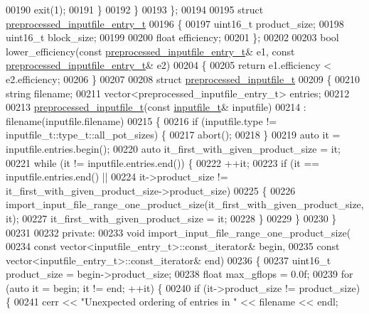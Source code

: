 \begin{DoxyCode}
{{00190       exit(1);
00191     \}
00192   \}
00193 \};
00194 
00195 \textcolor{keyword}{struct }\hyperlink{structpreprocessed__inputfile__entry__t}{preprocessed\_inputfile\_entry\_t}
00196 \{
00197   uint16\_t product\_size;
00198   uint16\_t block\_size;
00199 
00200   \textcolor{keywordtype}{float} efficiency;
00201 \};
00202 
00203 \textcolor{keywordtype}{bool} lower\_efficiency(\textcolor{keyword}{const} \hyperlink{structpreprocessed__inputfile__entry__t}{preprocessed\_inputfile\_entry\_t}& e1, \textcolor{keyword}{const} 
      \hyperlink{structpreprocessed__inputfile__entry__t}{preprocessed\_inputfile\_entry\_t}& e2)
00204 \{
00205   \textcolor{keywordflow}{return} e1.efficiency < e2.efficiency;
00206 \}
00207 
00208 \textcolor{keyword}{struct }\hyperlink{structpreprocessed__inputfile__t}{preprocessed\_inputfile\_t}
00209 \{
00210   \textcolor{keywordtype}{string} filename;
00211   vector<preprocessed\_inputfile\_entry\_t> entries;
00212 
00213   \hyperlink{structpreprocessed__inputfile__t}{preprocessed\_inputfile\_t}(\textcolor{keyword}{const} \hyperlink{structinputfile__t}{inputfile\_t}& inputfile)
00214     : filename(inputfile.filename)
00215   \{
00216     \textcolor{keywordflow}{if} (inputfile.type != inputfile\_t::type\_t::all\_pot\_sizes) \{
00217       abort();
00218     \}
00219     \textcolor{keyword}{auto} it = inputfile.entries.begin();
00220     \textcolor{keyword}{auto} it\_first\_with\_given\_product\_size = it;
00221     \textcolor{keywordflow}{while} (it != inputfile.entries.end()) \{
00222       ++it;
00223       \textcolor{keywordflow}{if} (it == inputfile.entries.end() ||
00224         it->product\_size != it\_first\_with\_given\_product\_size->product\_size)
00225       \{
00226         import\_input\_file\_range\_one\_product\_size(it\_first\_with\_given\_product\_size, it);
00227         it\_first\_with\_given\_product\_size = it;
00228       \}
00229     \}
00230   \}
00231 
00232 \textcolor{keyword}{private}:
00233   \textcolor{keywordtype}{void} import\_input\_file\_range\_one\_product\_size(
00234     \textcolor{keyword}{const} vector<inputfile\_entry\_t>::const\_iterator& begin,
00235     \textcolor{keyword}{const} vector<inputfile\_entry\_t>::const\_iterator& end)
00236   \{
00237     uint16\_t product\_size = begin->product\_size;
00238     \textcolor{keywordtype}{float} max\_gflops = 0.0f;
00239     \textcolor{keywordflow}{for} (\textcolor{keyword}{auto} it = begin; it != end; ++it) \{
00240       \textcolor{keywordflow}{if} (it->product\_size != product\_size) \{
00241         cerr << \textcolor{stringliteral}{"Unexpected ordering of entries in "} << filename << endl;
}}
\end{DoxyCode}
